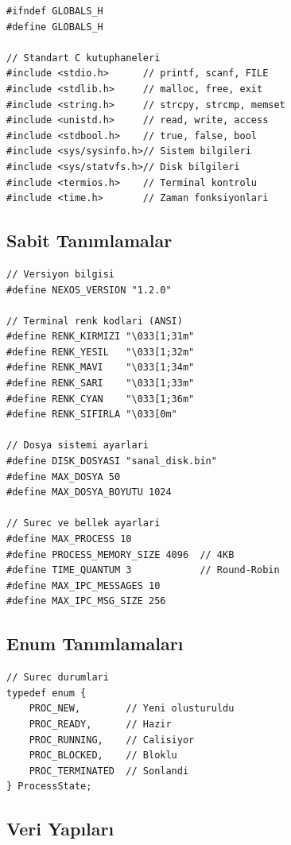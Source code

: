 \documentclass[12pt,a4paper]{report}
\begin{document}
\begin{lstlisting}[caption={globals.h - Baslangic}]
#ifndef GLOBALS_H
#define GLOBALS_H

// Standart C kutuphaneleri
#include <stdio.h>      // printf, scanf, FILE
#include <stdlib.h>     // malloc, free, exit
#include <string.h>     // strcpy, strcmp, memset
#include <unistd.h>     // read, write, access
#include <stdbool.h>    // true, false, bool
#include <sys/sysinfo.h>// Sistem bilgileri
#include <sys/statvfs.h>// Disk bilgileri
#include <termios.h>    // Terminal kontrolu
#include <time.h>       // Zaman fonksiyonlari
\end{lstlisting}

\subsection{Sabit Tanımlamalar}

\begin{lstlisting}[caption={globals.h - Sabitler}]
// Versiyon bilgisi
#define NEXOS_VERSION "1.2.0"

// Terminal renk kodlari (ANSI)
#define RENK_KIRMIZI "\033[1;31m"
#define RENK_YESIL   "\033[1;32m"
#define RENK_MAVI    "\033[1;34m"
#define RENK_SARI    "\033[1;33m"
#define RENK_CYAN    "\033[1;36m"
#define RENK_SIFIRLA "\033[0m"

// Dosya sistemi ayarlari
#define DISK_DOSYASI "sanal_disk.bin"
#define MAX_DOSYA 50
#define MAX_DOSYA_BOYUTU 1024

// Surec ve bellek ayarlari
#define MAX_PROCESS 10
#define PROCESS_MEMORY_SIZE 4096  // 4KB
#define TIME_QUANTUM 3            // Round-Robin
#define MAX_IPC_MESSAGES 10
#define MAX_IPC_MSG_SIZE 256
\end{lstlisting}

\subsection{Enum Tanımlamaları}

\begin{lstlisting}[caption={globals.h - Enumlar}]
// Surec durumlari
typedef enum {
    PROC_NEW,        // Yeni olusturuldu
    PROC_READY,      // Hazir
    PROC_RUNNING,    // Calisiyor
    PROC_BLOCKED,    // Bloklu
    PROC_TERMINATED  // Sonlandi
} ProcessState;
\end{lstlisting}

\subsection{Veri Yapıları}
\end{document}
